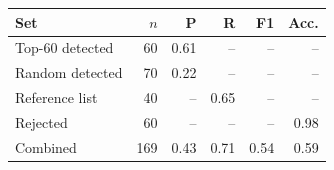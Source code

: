 \begin{tabular}{lrrrrr}
\toprule
Set & $n$ & P & R & F1 & Acc. \\
\midrule
Top-60 detected & 60 & 0.61 & -- & -- & -- \\
Random detected & 70 & 0.22 & -- & -- & -- \\
Reference list & 40 & -- & 0.65 & -- & -- \\
Rejected & 60 & -- & -- & -- & 0.98 \\
Combined & 169 & 0.43 & 0.71 & 0.54 & 0.59 \\
\bottomrule
\end{tabular}
